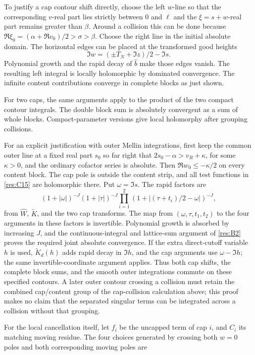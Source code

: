 \documentclass[11pt]{article}
\numberwithin{equation}{section}
\begin{document}
To justify a cap contour shift directly, choose the left \(w\)-line so
that the corresponding \(v\)-real part lies strictly between \(0\) and
\(\ell\) and the \(\xi=s+w\)-real part remains greater than \(\beta\).
Around a collision this can be done because
\(\Re \xi_0=(\alpha+\Re v_0)/2>\sigma>\beta\). Choose the right line in
the initial absolute domain. The horizontal edges can be placed at the
transformed good heights \[
 \Im w=(\pm T_N+\Im z)/2-\Im s.
\] Polynomial growth and the rapid decay of \(\widehat b\) make those
edges vanish. The resulting left integral is locally holomorphic by
dominated convergence. The infinite content contributions converge in
complete blocks as just shown.

For two caps, the same arguments apply to the product of the two compact
contour integrals. The double block sum is absolutely convergent as a
sum of whole blocks. Compact-parameter versions give local holomorphy
after grouping collisions.

For an explicit justification with outer Mellin integrations, first keep
the common outer line at a fixed real part \(s_0\) so far right that
\(2s_0-\alpha>v_R+\kappa\), for some \(\kappa>0\), and the ordinary
cofactor series is absolute. Then \(\Re w_0\leq-\kappa/2\) on every
content block. The cap pole is outside the content strip, and all test
functions in \eqref{res:C15} are holomorphic there. Put
\(\omega=\Im s\). The rapid factors are \[
 (1+|\omega|)^{-J}(1+|\tau|)^{-J}
 \prod_{i=1}^2(1+|(\tau+t_i)/2-\omega|)^{-J},
\] from \(\widehat W\), \(\widetilde K\), and the two cap transforms.
The map from \((\omega,\tau,t_1,t_2)\) to the four arguments in these
factors is invertible. Polynomial growth is absorbed by increasing
\(J\), and the continuous-integral and lattice-sum argument of
\eqref{res:B2} proves the required joint absolute convergence. If the
extra direct-cutoff variable \(h\) is used, \(\widetilde K_d(h)\) adds
rapid decay in \(\Im h\), and the cap arguments use \(\omega-\Im h\);
the same invertible-coordinate argument applies. Thus both cap shifts,
the complete block sums, and the smooth outer integrations commute on
these specified contours. A later outer contour crossing a collision
must retain the combined cap/content group of the cap-collision
calculation above; this proof makes no claim that the separated singular
terms can be integrated across a collision without that grouping.

For the local cancellation itself, let \(f_i\) be the uncapped term of
cap \(i\), and \(C_i\) its matching moving residue. The four choices
generated by crossing both \(w=0\) poles and both corresponding moving
poles are
\end{document}
